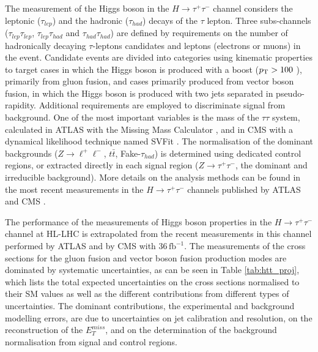 



The measurement of the Higgs boson  in the $H \to \tau^{+}\tau^{-}$ channel considers the leptonic ($\tau_{lep}$) and the hadronic ($\tau_{had}$) decays of the $\tau$ lepton. Three subs-channels ($\tau_{lep}\tau_{lep}$, $\tau_{lep}\tau_{had}$ and $\tau_{had}\tau_{had}$) are defined by requirements on the number of hadronically decaying $\tau$-leptons candidates and leptons (electrons or muons) in the event.
Candidate events are divided into categories using kinematic properties to target cases in which the Higgs boson is produced with a  boost ($p\sb{\scriptstyle\mathrm{T}} > 100$ \UGeV), primarily from gluon  fusion, and cases primarily produced from vector boson fusion, in which the Higgs boson is produced with two jets separated in pseudo-rapidity. Additional requirements are employed to discriminate signal from background. One of the most important variables is the mass of the $\tau\tau$ system, calculated in ATLAS with the Missing Mass Calculator \cite{Elagin:2010aw}, and in CMS with a  dynamical likelihood technique named SVFit \cite{Bianchini:2014vza}.
The normalisation of the dominant backgrounds ($Z\to\ell^{+}\ell^{-}$, $t\bar{t}$, Fake-$\tau_{had}$) is determined using dedicated control regions, or extracted directly in each signal region ($Z\to\tau^{+}\tau^{-}$, the dominant and irreducible background).  More details on the analysis methods can be found in the most recent measurements in the  $H \to \tau^{+}\tau^{-}$ channels published by ATLAS \cite{Aaboud:2018pen} and CMS \cite{Sirunyan:2017khh}.

The performance of the measurements of Higgs boson properties in the $H \to \tau^{+}\tau^{-}$ channel at HL-LHC is extrapolated from the recent measurements in this channel performed by ATLAS \cite{ATLAS-CONF-2018-021} and by CMS \cite{Sirunyan:2017khh} with 36\,$\mathrm{fb}^{-1}$. 
The measurements of the cross sections for the gluon fusion and vector boson fusion production modes are dominated by systematic uncertainties, as can be seen in Table \ref{tab:htt_proj}, which  lists the total expected uncertainties on the cross sections normalised to their SM values as well as  the different contributions from different types of uncertainties. 
The dominant contributions, the experimental and background modelling errors, are due to uncertainties on jet calibration and resolution, on the reconstruction of the $E_{T}^{miss}$, and on the determination of the background normalisation from signal and control regions.


